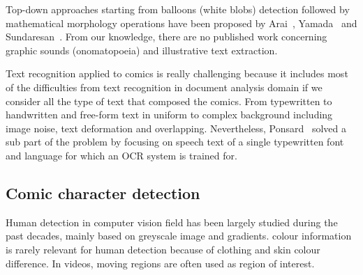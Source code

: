 Top-down approaches starting from balloons (white blobs) detection followed by mathematical morphology operations have been proposed by Arai~\cite{Arai11}, Yamada~\cite{Yam04} and Sundaresan~\cite{Sundaresan2012Text}.
From our knowledge, there are no published work concerning graphic sounds (onomatopoeia) and illustrative text extraction.

Text recognition applied to comics is really challenging because it includes most of the difficulties from text recognition in document analysis domain if we consider all the type of text that composed the comics.
From typewritten to handwritten and free-form text in uniform to complex background including image noise, text deformation and overlapping.
Nevertheless, Ponsard~\cite{ponsard2012ocr} solved a sub part of the problem by focusing on speech text of a single typewritten font and language for which an OCR system is trained for.


\subsection{Comic character detection}
\label{sec:sota:comic_character}



Human detection in computer vision field has been largely studied during the past decades, mainly based on greyscale image and gradients. colour information is rarely relevant for human detection because of clothing and skin colour difference. In videos, moving regions are often used as region of interest.

